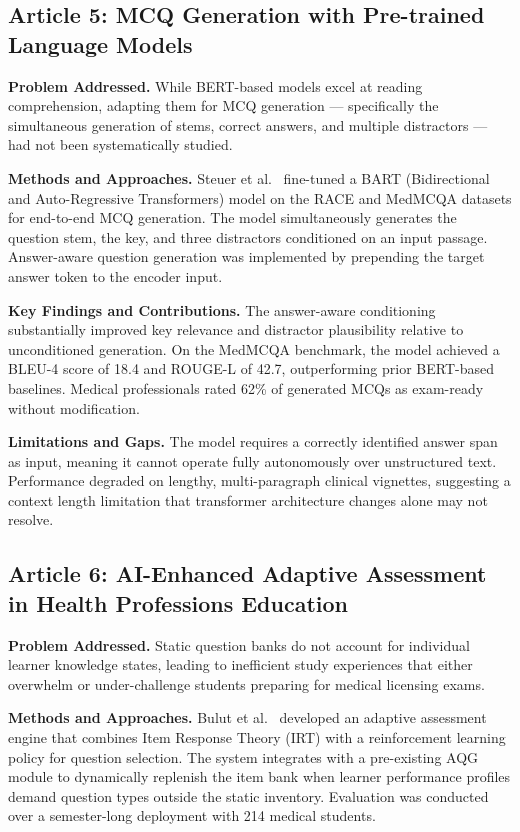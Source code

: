 \documentclass[conference]{IEEEtran}
\begin{document}
\subsection{Article 5: MCQ Generation with Pre-trained Language Models~\cite{steuer2021mcq}}

\textbf{Problem Addressed.} While BERT-based models excel at reading comprehension, adapting them for MCQ generation — specifically the simultaneous generation of stems, correct answers, and multiple distractors — had not been systematically studied.

\textbf{Methods and Approaches.} Steuer et al.~\cite{steuer2021mcq} fine-tuned a BART (Bidirectional and Auto-Regressive Transformers) model on the RACE and MedMCQA datasets for end-to-end MCQ generation. The model simultaneously generates the question stem, the key, and three distractors conditioned on an input passage. Answer-aware question generation was implemented by prepending the target answer token to the encoder input.

\textbf{Key Findings and Contributions.} The answer-aware conditioning substantially improved key relevance and distractor plausibility relative to unconditioned generation. On the MedMCQA benchmark, the model achieved a BLEU-4 score of 18.4 and ROUGE-L of 42.7, outperforming prior BERT-based baselines. Medical professionals rated 62\% of generated MCQs as exam-ready without modification.

\textbf{Limitations and Gaps.} The model requires a correctly identified answer span as input, meaning it cannot operate fully autonomously over unstructured text. Performance degraded on lengthy, multi-paragraph clinical vignettes, suggesting a context length limitation that transformer architecture changes alone may not resolve.

\subsection{Article 6: AI-Enhanced Adaptive Assessment in Health Professions Education~\cite{bulut2023adaptive}}

\textbf{Problem Addressed.} Static question banks do not account for individual learner knowledge states, leading to inefficient study experiences that either overwhelm or under-challenge students preparing for medical licensing exams.

\textbf{Methods and Approaches.} Bulut et al.~\cite{bulut2023adaptive} developed an adaptive assessment engine that combines Item Response Theory (IRT) with a reinforcement learning policy for question selection. The system integrates with a pre-existing AQG module to dynamically replenish the item bank when learner performance profiles demand question types outside the static inventory. Evaluation was conducted over a semester-long deployment with 214 medical students.
\end{document}
